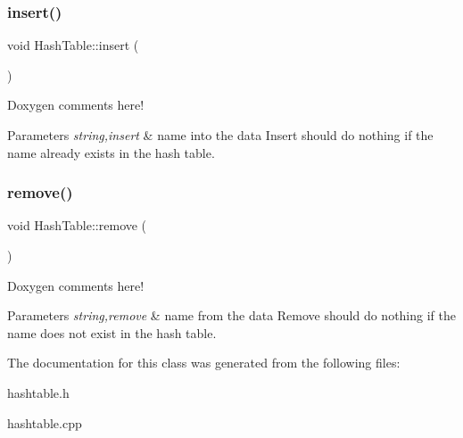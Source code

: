 \subsubsection{\texorpdfstring{insert()}{insert()}}
{\footnotesize\ttfamily void Hash\+Table\+::insert (\begin{DoxyParamCaption}\item[{std\+::string}]{ }\end{DoxyParamCaption})}

Doxygen comments here! 
\begin{DoxyParams}{Parameters}
{\em string,insert} & name into the data Insert should do nothing if the name already exists in the hash table. \\
\hline
\end{DoxyParams}
\mbox{\label{class_hash_table_ab694b19c12f60a867a63b5e694762f01}} 
\subsubsection{\texorpdfstring{remove()}{remove()}}
{\footnotesize\ttfamily void Hash\+Table\+::remove (\begin{DoxyParamCaption}\item[{std\+::string}]{ }\end{DoxyParamCaption})}

Doxygen comments here! 
\begin{DoxyParams}{Parameters}
{\em string,remove} & name from the data Remove should do nothing if the name does not exist in the hash table. \\
\hline
\end{DoxyParams}


The documentation for this class was generated from the following files\+:\begin{DoxyCompactItemize}
\item 
hashtable.\+h\item 
hashtable.\+cpp\end{DoxyCompactItemize}
